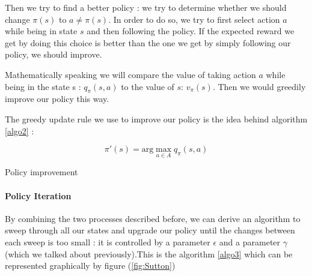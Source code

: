 \documentclass[14pt,a4paper]{article}
\theoremstyle{definition}
\begin{document}
Then we try to find a better policy : we try to determine whether we should change $\pi(s) $ to $ a\neq\pi(s)$. In order to do so, we try to first select action $a$ while being in state $s$ and then following the policy. If the expected reward we get by doing this choice is better than the one we get by simply following our policy, we should improve.

Mathematically speaking we will compare the value of taking action $a$ while being in the state s : $q_{\pi}(s,a)$ to the value of $s$: $v_{\pi}(s)$. Then we would greedily improve our policy this way.

The greedy update rule we use to improve our policy is the idea behind algorithm \ref{algo2} : 

$$ 
\pi'(s)=\text{arg}\max_{a \in A}q_{\pi}(s,a)
$$

\begin{algorithm}
\label{algo2}

    
    \caption{Policy improvement}
\end{algorithm}



\paragraph{Policy Iteration} By combining the two processes described before, we can derive an algorithm to sweep through all our states and upgrade our policy until the changes between each sweep is too small : it is controlled by a parameter $\epsilon$ and a parameter $\gamma$ (which we talked about previously).This is the algorithm \ref{algo3} which can be represented graphically by figure (\ref{fig:Sutton})
\end{document}
